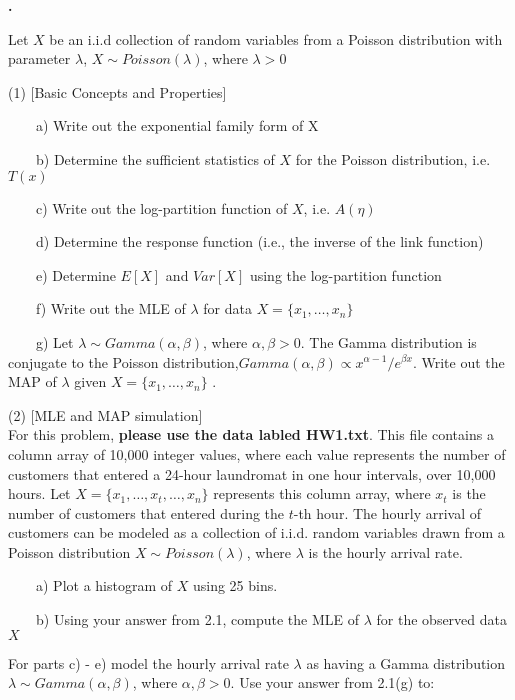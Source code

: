 \documentclass{article}
\newcounter{pcounter}                                   %
\newenvironment{problem}                                %
{                                                       %
    \stepcounter{pcounter}                              %
    \textbf{\arabic{pcounter}.}                         %
}{}                                                     %
\newcommand{\tab}{\ \ \ \ }                             %
\begin{document}
    \begin{problem}
        Let $X$ be an i.i.d collection of random variables from a Poisson distribution with parameter $\lambda$, $X \sim Poisson(\lambda)$, where $\lambda > 0$

        (1) [Basic Concepts and Properties]

        \tab a) Write out the exponential family form of X
        
        \tab b) Determine the sufficient statistics of $X$ for the Poisson distribution, i.e. $T(x)$
        
        \tab c) Write out the log-partition function of $X$, i.e. $A(\eta)$
        
        \tab d) Determine the response function (i.e., the inverse of the link function)
        
        \tab e) Determine $E[X]$ and $Var[X]$ using the log-partition function
        
        \tab f) Write out the MLE of $\lambda$ for data $X=\{x_1, \dots, x_n\}$
        
        \tab g) Let $\lambda \sim Gamma(\alpha, \beta)$, where $\alpha, \beta > 0$. The Gamma distribution is conjugate to the Poisson distribution,$ Gamma(\alpha, \beta) \propto x^{\alpha - 1} / e^{\beta x}$. Write out the MAP of $\lambda$ given $X=\{x_1, \dots, x_n\}$ .

        (2) [MLE and MAP simulation] \\
        For this problem, \textbf{please use the data labled HW1.txt}. This file contains a column array of 10,000 integer values, where each value represents the number of customers that entered a 24-hour laundromat in one hour intervals, over 10,000 hours.
        Let $X = \{x_1, \dots, x_t, \dots, x_n\}$ represents this column array, where $x_t$ is the number of customers that entered during the $t$-th hour. The hourly arrival of customers can be modeled as a collection of i.i.d. random variables drawn from a Poisson distribution $X \sim Poisson(\lambda)$, where $\lambda$ is the hourly arrival rate.
        
        \tab a) Plot a histogram of $X$ using 25 bins.
        
        \tab b) Using your answer from 2.1, compute the MLE of $\lambda$ for the observed data $X$ 

        For parts c) - e) model the hourly arrival rate $\lambda$ as having a Gamma distribution $\lambda \sim Gamma(\alpha, \beta)$, where $\alpha, \beta > 0$. Use your answer from 2.1(g) to:
        

\end{problem}
\end{document}

